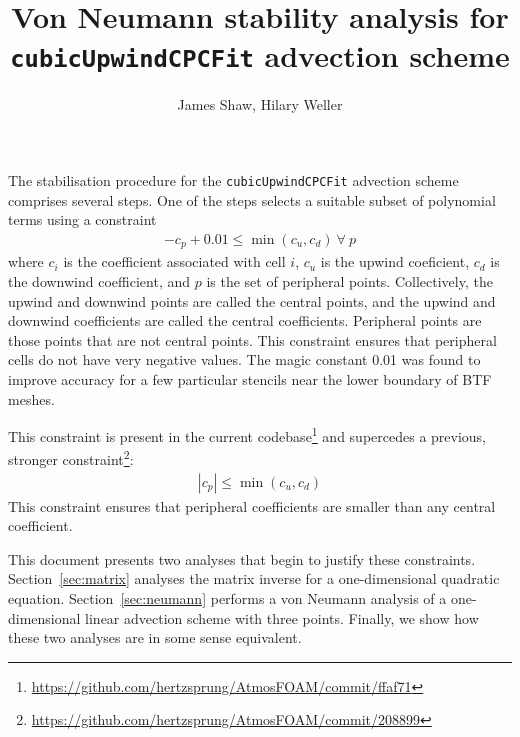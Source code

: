 \documentclass{article}
\title{Von Neumann stability analysis for \texttt{cubicUpwindCPCFit} advection scheme}
\author{James Shaw, Hilary Weller}
\begin{document}
\maketitle

The stabilisation procedure for the \texttt{cubicUpwindCPCFit} advection scheme comprises several steps.  One of the steps selects a suitable subset of polynomial terms using a constraint
\begin{align}
	-c_p + 0.01 \leq \min(c_u, c_d)\:\forall\:p
\end{align}
where $c_i$ is the coefficient associated with cell $i$, $c_u$ is the upwind coeficient, $c_d$ is the downwind coefficient, and $p$ is the set of peripheral points.  Collectively, the upwind and downwind points are called the central points, and the upwind and downwind coefficients are called the central coefficients.  Peripheral points are those points that are not central points.
This constraint ensures that peripheral cells do not have very negative values.  The magic constant \num{0.01} was found to improve accuracy for a few particular stencils near the lower boundary of BTF meshes.

This constraint is present in the current codebase\footnote{\url{https://github.com/hertzsprung/AtmosFOAM/commit/ffaf71}} and supercedes a previous, stronger constraint\footnote{\url{https://github.com/hertzsprung/AtmosFOAM/commit/208899}}:
\begin{align}
	|c_p| \leq \min(c_u, c_d)
\end{align}
This constraint ensures that peripheral coefficients are smaller than any central coefficient.

This document presents two analyses that begin to justify these constraints.  Section~\ref{sec:matrix} analyses the matrix inverse for a one-dimensional quadratic equation.  Section~\ref{sec:neumann} performs a von Neumann analysis of a one-dimensional linear advection scheme with three points.  Finally, we show how these two analyses are in some sense equivalent.
\end{document}
